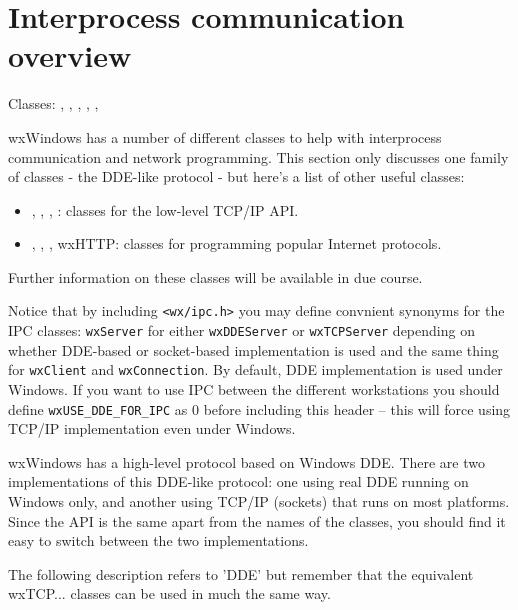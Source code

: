 \section{Interprocess communication overview}\label{ipcoverview}

Classes: , , 
, 
, , 

wxWindows has a number of different classes to help with interprocess communication
and network programming. This section only discusses one family of classes - the DDE-like
protocol - but here's a list of other useful classes:

\begin{itemize}\itemsep=0pt
\item {}, 
, 
, 
: classes for the low-level TCP/IP API.
\item {}, , , wxHTTP: classes
for programming popular Internet protocols.
\end{itemize}

Further information on these classes will be available in due course.

Notice that by including {\tt <wx/ipc.h>} you may define convnient synonyms for
the IPC classes: {\tt wxServer} for either {\tt wxDDEServer} or 
{\tt wxTCPServer} depending on whether DDE-based or socket-based implementation
is used and the same thing for {\tt wxClient} and {\tt wxConnection}. By
default, DDE implementation is used under Windows. If you want to use IPC
between the different workstations you should define {\tt wxUSE\_DDE\_FOR\_IPC}
as $0$ before including this header -- this will force using TCP/IP
implementation even under Windows.


wxWindows has a high-level protocol based on Windows DDE.
There are two implementations of this DDE-like protocol:
one using real DDE running on Windows only, and another using TCP/IP (sockets) that runs
on most platforms. Since the API is the same apart from the names of the classes, you
should find it easy to switch between the two implementations.

The following description refers to 'DDE' but remember that the equivalent wxTCP... classes
can be used in much the same way.

